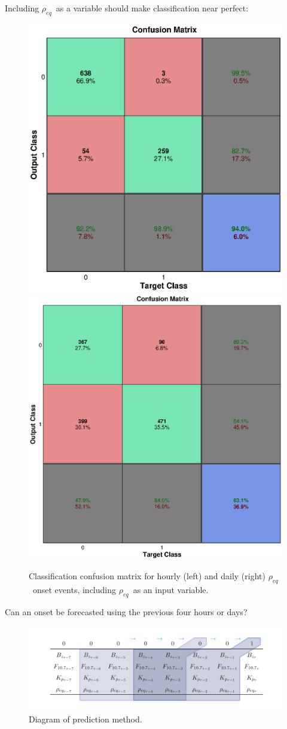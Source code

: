 \documentclass[xcolor={dvipsnames,table}]{beamer}
\newcommand{\req}{\ensuremath{\rho_{eq}}} %
\begin{document}
\begin{frame}
	Including \req\ as a variable should make classification near perfect:
	\begin{figure}[htp!]
		\centering
		\includegraphics[width=0.45\linewidth]{Figures/CH5/NNBinaryOnset-hourly-withreq.eps}
		\includegraphics[width=0.45\linewidth]{Figures/CH5/NNBinaryOnset-daily-withreq.eps}
		\caption{Classification confusion matrix for hourly (left) and daily (right) \req\ onset events, including \req\ as an input variable.}
		\label{fig:OnsetWithreq}
	\end{figure}
\end{frame}


\begin{frame}
	Can an onset be forecasted using the previous four hours or days?
	\begin{figure}[htp!]
		\centering
		\includegraphics[width=1\linewidth]{Figures/CH5/FullGraphic.png}
		\caption{Diagram of prediction method.}
		\label{fig:ClassifyDiagram}
	\end{figure}
	
	
\end{frame}
\end{document}
